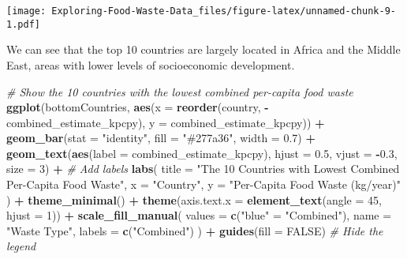 \documentclass[
]{article}
\newenvironment{Shaded}{\begin{snugshade}}{\end{snugshade}}
\newcommand{\AttributeTok}[1]{\textcolor[rgb]{0.13,0.29,0.53}{#1}}
\newcommand{\CommentTok}[1]{\textcolor[rgb]{0.56,0.35,0.01}{\textit{#1}}}
\newcommand{\ConstantTok}[1]{\textcolor[rgb]{0.56,0.35,0.01}{#1}}
\newcommand{\DecValTok}[1]{\textcolor[rgb]{0.00,0.00,0.81}{#1}}
\newcommand{\FloatTok}[1]{\textcolor[rgb]{0.00,0.00,0.81}{#1}}
\newcommand{\FunctionTok}[1]{\textcolor[rgb]{0.13,0.29,0.53}{\textbf{#1}}}
\newcommand{\NormalTok}[1]{#1}
\newcommand{\OtherTok}[1]{\textcolor[rgb]{0.56,0.35,0.01}{#1}}
\newcommand{\SpecialCharTok}[1]{\textcolor[rgb]{0.81,0.36,0.00}{\textbf{#1}}}
\newcommand{\StringTok}[1]{\textcolor[rgb]{0.31,0.60,0.02}{#1}}
\begin{document}
\texttt{[image: Exploring-Food-Waste-Data\_files/figure-latex/unnamed-chunk-9-1.pdf]}

We can see that the top 10 countries are largely located in Africa and
the Middle East, areas with lower levels of socioeconomic development.

\begin{Shaded}
\begin{Highlighting}[]
\CommentTok{\# Show the 10 countries with the lowest combined per{-}capita food waste}
\FunctionTok{ggplot}\NormalTok{(bottomCountries, }\FunctionTok{aes}\NormalTok{(}\AttributeTok{x =} \FunctionTok{reorder}\NormalTok{(country, }\SpecialCharTok{{-}}\NormalTok{combined\_estimate\_kpcpy), }\AttributeTok{y =}\NormalTok{ combined\_estimate\_kpcpy)) }\SpecialCharTok{+}
  \FunctionTok{geom\_bar}\NormalTok{(}\AttributeTok{stat =} \StringTok{"identity"}\NormalTok{, }\AttributeTok{fill =} \StringTok{"\#277a36"}\NormalTok{, }\AttributeTok{width =} \FloatTok{0.7}\NormalTok{) }\SpecialCharTok{+}
  \FunctionTok{geom\_text}\NormalTok{(}\FunctionTok{aes}\NormalTok{(}\AttributeTok{label =}\NormalTok{ combined\_estimate\_kpcpy), }\AttributeTok{hjust =} \FloatTok{0.5}\NormalTok{, }\AttributeTok{vjust =} \SpecialCharTok{{-}}\FloatTok{0.3}\NormalTok{, }\AttributeTok{size =} \DecValTok{3}\NormalTok{) }\SpecialCharTok{+}  \CommentTok{\# Add labels}
  \FunctionTok{labs}\NormalTok{(}
    \AttributeTok{title =} \StringTok{"The 10 Countries with Lowest Combined Per{-}Capita Food Waste"}\NormalTok{,}
    \AttributeTok{x =} \StringTok{"Country"}\NormalTok{,}
    \AttributeTok{y =} \StringTok{"Per{-}Capita Food Waste (kg/year)"}
\NormalTok{  ) }\SpecialCharTok{+}
  \FunctionTok{theme\_minimal}\NormalTok{() }\SpecialCharTok{+}
  \FunctionTok{theme}\NormalTok{(}\AttributeTok{axis.text.x =} \FunctionTok{element\_text}\NormalTok{(}\AttributeTok{angle =} \DecValTok{45}\NormalTok{, }\AttributeTok{hjust =} \DecValTok{1}\NormalTok{)) }\SpecialCharTok{+}
  \FunctionTok{scale\_fill\_manual}\NormalTok{(}
    \AttributeTok{values =} \FunctionTok{c}\NormalTok{(}\StringTok{"blue"} \OtherTok{=} \StringTok{"Combined"}\NormalTok{),}
    \AttributeTok{name =} \StringTok{"Waste Type"}\NormalTok{,}
    \AttributeTok{labels =} \FunctionTok{c}\NormalTok{(}\StringTok{"Combined"}\NormalTok{)}
\NormalTok{  ) }\SpecialCharTok{+}
  \FunctionTok{guides}\NormalTok{(}\AttributeTok{fill =} \ConstantTok{FALSE}\NormalTok{)  }\CommentTok{\# Hide the legend}
\end{Highlighting}
\end{Shaded}
\end{document}
